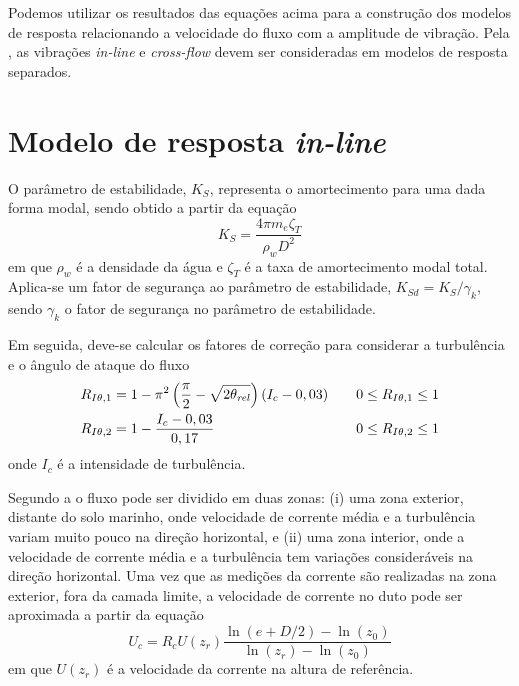 Podemos utilizar os resultados das equações acima para a construção dos modelos de resposta relacionando a velocidade do fluxo com a amplitude de vibração.
Pela , as vibrações \textit{in-line} e \textit{cross-flow} devem ser consideradas em modelos de resposta separados.


\section{Modelo de resposta \textit{in-line}}\label{sec:modelo-resposta-inline}

O parâmetro de estabilidade, $K_S$, representa o amortecimento para uma dada forma modal, sendo obtido a partir da equação
\begin{equation}
\label{eq:viv-Ks}
K_S = \frac{4 \pi m_e \zeta_T}{\rho_w D^2}
\end{equation}
em que $\rho_w$ é a densidade da água e $\zeta_T$ é a taxa de amortecimento modal total.
Aplica-se um fator de segurança ao parâmetro de estabilidade, $K_\mathit{Sd} = K_S/\gamma_k$, sendo $\gamma_k$ o fator de segurança no parâmetro de estabilidade.

Em seguida, deve-se calcular os fatores de correção para considerar a turbulência e o ângulo de ataque do fluxo
\begin{equation}
\label{eq:viv-Riot}
\begin{aligned}
	R_{I\theta,1} &= 1 - \pi^2\left(\frac{\pi}{2} - \sqrt{2 \theta_\mathit{rel}}\right)(I_c - 0,03) & \quad \mbox 0 \leq R_{I\theta,1} \leq 1\\
    R_{I\theta,2} &= 1 - \frac{I_c - 0,03}{0,17}                                                    & \quad \mbox  0 \leq R_{I\theta,2} \leq 1
\end{aligned}
\end{equation}
onde $I_c$ é a intensidade de turbulência.

Segundo a  o fluxo pode ser dividido em duas zonas: (i) uma zona exterior, distante do solo marinho, onde velocidade de corrente média e a turbulência variam muito pouco na direção horizontal, e (ii) uma zona interior, onde a velocidade de corrente média e a turbulência tem variações consideráveis na direção horizontal. Uma vez que as medições da corrente são realizadas na zona exterior, fora da camada limite, a velocidade de corrente no duto pode ser aproximada a partir da equação
\begin{equation}
\label{eq:vel-corrente}
U_c = R_c U(z_r) \frac{\ln{(e+D/2)} - \ln(z_0)}{\ln (z_r)- \ln (z_0)}
\end{equation}
em que $U(z_r)$ é a velocidade da corrente na altura de referência.


